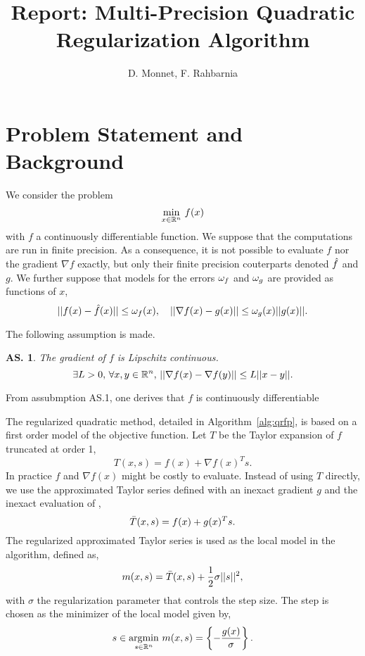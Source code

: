 \documentclass{article}[12pt]
\author{D. Monnet, F. Rahbarnia}
\title{Report: Multi-Precision Quadratic Regularization Algorithm}
\newtheorem{assumption}[]{\textbf{AS.}}
\begin{document}
	\maketitle
	
	\section{Problem Statement and Background}
	
	We consider the problem
	\begin{equation*}
		\min_{x\in \mathbb{R}^n} \, f(x)
	\end{equation*}
	with $f$ a continuously differentiable function. We suppose that the computations are run in finite precision. As a consequence, it is not possible to evaluate $f$ nor the gradient $\nabla f$ exactly, but only their finite precision couterparts denoted $\hat{f}$ and $g$. We further suppose that models for the errors $\omega_f$ and $\omega_g$ are provided as functions of $x$,
	\begin{equation}
		\label{eq:fgerr}
		||f(x)-\hat{f}(x)||\leq \omega_f(x), \quad ||\nabla f(x)-g(x)||\leq \omega_g(x)||g(x)||.
	\end{equation}

	The following assumption is made.
	
	\begin{assumption}
	\label{as:grad_lipschitz}	
	The gradient of $f$ is Lipschitz continuous.
	\begin{equation}
		\label{as:lips}
		\exists L>0,\, \forall x,y \in \mathbb{R}^n,\, ||\nabla f(x) - \nabla f(y)|| \leq L||x-y||.
	\end{equation}
	\end{assumption} 
	From assubmption AS.1, one derives that $f$ is continuously differentiable

	The regularized quadratic method, detailed in Algorithm~\ref{alg:qrfp}, is based on a first order model of the objective function. Let $T$ be the Taylor expansion of $f$ truncated at order 1,
	\begin{equation}
		T(x,s) = f(x) + \nabla f(x)^Ts.
	\end{equation}
    In practice $f$ and $\nabla f(x)$ might be costly to evaluate. Instead of using $T$ directly, we use the approximated Taylor series defined with an inexact gradient $g$ and the inexact evaluation of ,
    \begin{equation}
    	\bar{T}(x,s) = f(x) + g(x)^Ts.
    \end{equation} 
	The regularized approximated Taylor series is used as the local model in the algorithm, defined as,
	\begin{equation}
		m(x,s) = \bar{T}(x,s) + \dfrac{1}{2}\sigma||s||^2,
	\end{equation}
    with $\sigma$ the regularization parameter that controls the step size. The step is chosen as the minimizer of the local model given by,
	\begin{equation}
		s \in \operatorname*{argmin}_{s\in\mathbb{R}^n} \,  m(x,s) = \left\{-\dfrac{g(x)}{\sigma}\right\}.
	\end{equation}
	
\end{document}
